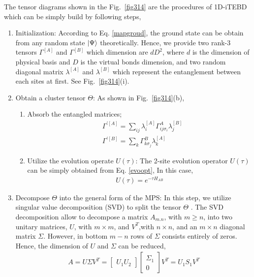 The tensor diagrams shown in the Fig.~\ref{fig314} are the procedures of 1D-iTEBD which can be simply build by following steps,
\begin{enumerate}
	\item Initialization: According to Eq. \ref{mapgroud}, the ground state can be obtain from any random state $\Ket{\Psi}$ theoretically. Hence, we provide two rank-3 tensors $\Gamma^{[A]}$ and $\Gamma^{[B]}$ which dimension are $dD^2$, where $d$ is the dimension of physical basis and $D$ is the virtual bonds dimension, and two random diagonal matrix $\lambda^{[A]}$ and $\lambda^{[B]}$ which represent the entanglement between each sites at first. See Fig.~\ref{fig314}(i).
	\item Obtain a cluster tensor $\Theta$: As shown in Fig.~\ref{fig314}(b),
		\begin{enumerate}
			\item Absorb the entangled matrices; 
				\begin{align}
					&\Gamma^{\prime [A]} = \sum_{ij}{\lambda^{[A]}_{i} \Gamma^{A}_{ij \sigma_i} \lambda^{[B]}_{j}} \\
					&\Gamma^{\prime [B]} = \sum_{k}{\Gamma^{B}_{k \sigma_j} \lambda^{[A]}_{k}}
				\end{align}
			\item Utilize the evolution operate $U(\tau)$: The 2-site evolution operator $U(\tau)$ can be simply obtained from Eq. \ref{evoopt}, In this case, 
				\begin{align}
					U(\tau) = e^{-\tau H_{AB}}
				\end{align}
		\end{enumerate}
	\item Decompose $\Theta$ into the general form of the MPS: In this step, we utilize singular value decomposition (SVD) to split the tensor $\Theta$ . The SVD decomposition allow to decompose a matrix $A_{m.n}$, with $m \geq n$, into two unitary matrices, $U$, with $m \times m$, and $V^{T}$,with $n \times n$, and an $m \times n$ diagonal matrix $\Sigma$. However, in bottom $m - n$ rows of $\Sigma$ consists entirely of zeros. Hence, the dimension of $U$ and $\Sigma$ can be reduced,
		\begin{align}
			A = U \Sigma V^T = \begin{bmatrix} U_1 U_2 \end{bmatrix} \begin{bmatrix} \Sigma_1 \\ 0 \end{bmatrix} V^T = U_1 S_1 V^T
		\end{align}

\end{enumerate}
